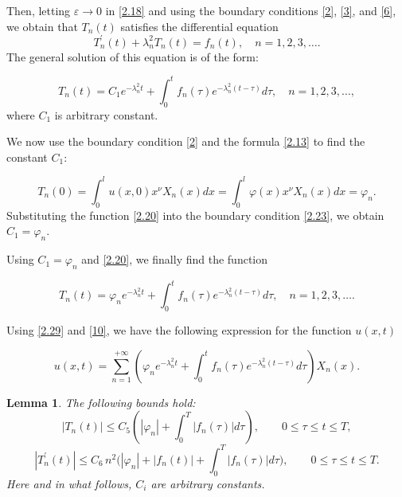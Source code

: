 \documentclass[reqno]{amsart}
\newtheorem{lem}[thm]{Lemma}
\theoremstyle{definition}
\numberwithin{equation}{section}
\begin{document}
Then, letting $\varepsilon \rightarrow 0$ in \eqref{2.18} and using the boundary conditions \eqref{2}, \eqref{3}, and \eqref{6}, we obtain that $T_n(t)$ satisfies the differential equation
\begin{equation}\label{eq10}
T_n^{\prime}(t)+\lambda_{n}^{2} T_n(t)=f_n(t), \quad n=1,2,3, \ldots.
\end{equation}
The general solution of this equation is of the form:

\begin{equation}\label{2.20}
    T_n(t)=C_1 e^{-\lambda_n^2t}+\int_0^t f_n(\tau) e^{-\lambda_n^2\left(t-\tau\right)} d \tau, \quad n=1,2,3, \ldots,
\end{equation}
where $C_1$ is arbitrary constant.

We now use the boundary condition \eqref{2} and the formula \eqref{2.13} to find the
constant $C_1$:

\begin{equation}\label{2.23}
    T_n(0)=\int_0^l{u(x,0)x^\nu X_n(x)dx}=\int_0^l{\varphi(x)x^\nu X_n(x)dx=\varphi_n.}
\end{equation}
Substituting the function \eqref{2.20} into the boundary condition \eqref{2.23},
we obtain  $C_1=\varphi_n$. 

Using $C_1=\varphi_n$ and \eqref{2.20}, we finally find the function 


\begin{equation}\label{2.29}
     T_n(t)=\varphi_ne^{-\lambda_n^2t}+\int_0^t f_n(\tau) e^{-\lambda_n^2\left(t-\tau\right)} d \tau, \quad n=1,2,3, \ldots.
\end{equation}

Using \eqref{2.29} and \eqref{10}, we have the following expression for the function $u(x, t)$

\begin{equation}\label{15}
    u(x, t)=\sum_{n=1}^{+\infty}\left(\varphi_ne^{-\lambda_n^2t}+\int_0^t f_n(\tau) e^{-\lambda_n^2\left(t-\tau\right)} d \tau\right) X_n(x).
\end{equation}

\begin{lem}\label{lemm1}
The following bounds hold:
    \begin{equation}\label{eq1}
\left|T_n(t)\right|\le C_5\left(|\varphi_n|+\int_0^T|f_n(\tau)|
d\tau\right), \qquad 0\le \tau\le t\le T,    
    \end{equation}
    \begin{equation}\label{eq2}
        |T^{\prime}_n(t)|\le C_6\,n^2\big(|\varphi_n|+|f_n(t)|+\int_0^T|f_n(\tau)|d\tau\big), \qquad 0\le \tau\le t\le T.
    \end{equation}
Here and in what follows, $C_i$ are arbitrary constants.
\end{lem} 
\end{document}
